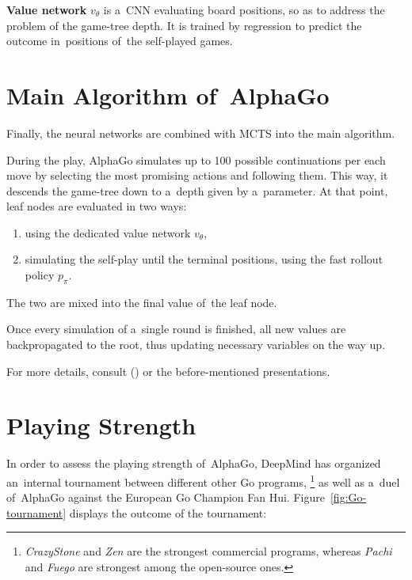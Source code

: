 \textbf{Value network} $v_\theta$ is a~CNN evaluating board positions, so as to address the problem of the game-tree depth.
It is trained by regression to predict the outcome in~positions of~the self-played games.

\section{Main Algorithm of~AlphaGo}

Finally, the neural networks are combined with MCTS into the main algorithm.

During the play, AlphaGo simulates up to 100 possible continuations per each move by selecting the most promising actions and following them.
This way, it descends the game-tree down to a~depth given by a~parameter.
At that point, leaf nodes are evaluated in two ways:
\begin{enumerate}[(1)]
  \item using the dedicated value network $v_\theta$,
  \item simulating the self-play until the terminal positions, using the fast rollout policy $p_\pi$.
\end{enumerate}
The two are mixed into the final value of~the leaf node.

Once every simulation of a~single round is finished, all new values are backpropagated to the root, thus updating necessary variables on the way up.

For more details, consult (\cite{Silver2016mastering}) or the before-mentioned presentations.


\section{Playing Strength}

In order to assess the playing strength of~AlphaGo, DeepMind has organized an~internal tournament between different other Go programs,%
\footnote{\emph{CrazyStone} and \emph{Zen} are the strongest commercial programs, whereas \emph{Pachi} and \emph{Fuego} are strongest among the open-source ones.}
as well as a~duel of~AlphaGo against the European Go Champion Fan Hui.
Figure~\ref{fig:Go-tournament} displays the outcome of the tournament:

